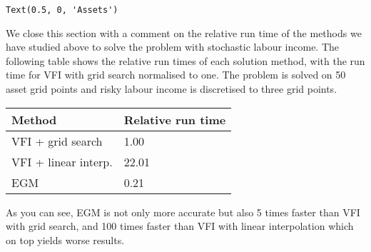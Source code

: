 \documentclass{scrartcl}
\makeatletter
\newcommand{\boxspacing}{\kern\kvtcb@left@rule\kern\kvtcb@boxsep}
\newcommand{\prompt}[4]{
        {\ttfamily\llap{{\color{#2}[#3]:\hspace{3pt}#4}}\vspace{-\baselineskip}}
    }
\makeatother
\begin{document}
            \begin{tcolorbox}[breakable, size=fbox, boxrule=.5pt, pad at break*=1mm, opacityfill=0]
\prompt{Out}{outcolor}{26}{\boxspacing}
\begin{Verbatim}[commandchars=\\\{\}]
Text(0.5, 0, 'Assets')
\end{Verbatim}
\end{tcolorbox}
        
    \begin{center}
    \end{center}
    
    We close this section with a comment on the relative run time of the
methods we have studied above to solve the problem with stochastic
labour income. The following table shows the relative run times of each
solution method, with the run time for VFI with grid search normalised
to one. The problem is solved on 50 asset grid points and risky labour
income is discretised to three grid points.

\begin{longtable}[]{@{}ll@{}}
\toprule
Method & Relative run time\tabularnewline
\midrule
\endhead
VFI + grid search & 1.00\tabularnewline
VFI + linear interp. & 22.01\tabularnewline
EGM & 0.21\tabularnewline
\bottomrule
\end{longtable}

As you can see, EGM is not only more accurate but also 5 times faster
than VFI with grid search, and 100 times faster than VFI with linear
interpolation which on top yields worse results.


    
    
    
\end{document}
